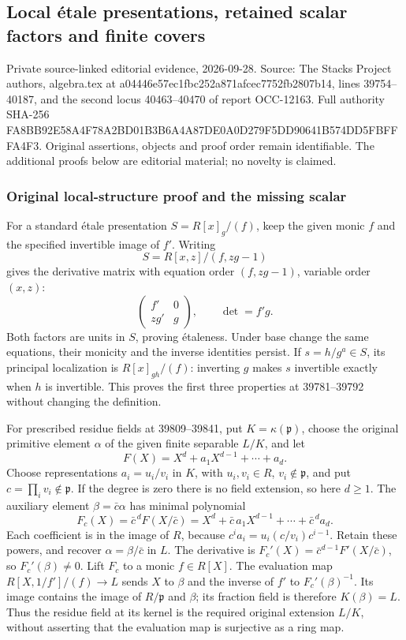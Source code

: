 \subsection{Local étale presentations, retained scalar factors and finite covers}\label{algebra-proof-052-local-uxe9tale-presentations-retained-scalar-factors-and-finite-covers}

Private source-linked editorial evidence, 2026-09-28. Source: The Stacks Project authors, algebra.tex at a04446e57ec1fbc252a871afcec7752fb2807b14, lines 39754--40187, and the second locus 40463--40470 of report OCC-12163. Full authority SHA-256 FA8BB92E58A4F78A2BD01B3B6A4A87DE0A0D279F5DD90641B574DD5FBFFFA4F3. Original assertions, objects and proof order remain identifiable. The additional proofs below are editorial material; no novelty is claimed.

\subsubsection{Original local-structure proof and the missing scalar}\label{algebra-proof-052-original-local-structure-proof-and-the-missing-scalar}

For a standard étale presentation \(S=R[x]_g/(f)\), keep the given monic \(f\) and the specified invertible image of \(f'\). Writing \[
S=R[x,z]/(f,zg-1)
\] gives the derivative matrix with equation order \((f,zg-1)\), variable order \((x,z)\): \[
\begin{pmatrix} f'&0\\zg'&g\end{pmatrix},
\qquad \det=f'g.
\] Both factors are units in \(S\), proving étaleness. Under base change the same equations, their monicity and the inverse identities persist. If \(s=h/g^a\in S\), its principal localization is \(R[x]_{gh}/(f)\): inverting \(g\) makes \(s\) invertible exactly when \(h\) is invertible. This proves the first three properties at 39781--39792 without changing the definition.

For prescribed residue fields at 39809--39841, put \(K=\kappa(\mathfrak p)\), choose the original primitive element \(\alpha\) of the given finite separable \(L/K\), and let \[
F(X)=X^d+a_1X^{d-1}+\cdots+a_d.
\] Choose representations \(a_i=u_i/v_i\) in \(K\), with \(u_i,v_i\in R\), \(v_i\notin\mathfrak p\), and put \(c=\prod_i v_i\notin\mathfrak p\). If the degree is zero there is no field extension, so here \(d\ge1\). The auxiliary element \(\beta=\bar c\alpha\) has minimal polynomial \[
F_c(X)=\bar c^{\,d}F(X/\bar c)
=X^d+\bar c\,a_1X^{d-1}+\cdots+\bar c^{\,d}a_d.
\] Each coefficient is in the image of \(R\), because \(c^i a_i=u_i(c/v_i)c^{i-1}\). Retain these powers, and recover \(\alpha=\beta/\bar c\) in \(L\). The derivative is \(F_c'(X)=\bar c^{d-1}F'(X/\bar c)\), so \(F_c'(\beta)\ne0\). Lift \(F_c\) to a monic \(f\in R[X]\). The evaluation map \(R[X,1/f']/(f)\to L\) sends \(X\) to \(\beta\) and the inverse of \(f'\) to \(F_c'(\beta)^{-1}\). Its image contains the image of \(R/\mathfrak p\) and \(\beta\); its fraction field is therefore \(K(\beta)=L\). Thus the residue field at its kernel is the required original extension \(L/K\), without asserting that the evaluation map is surjective as a ring map.

